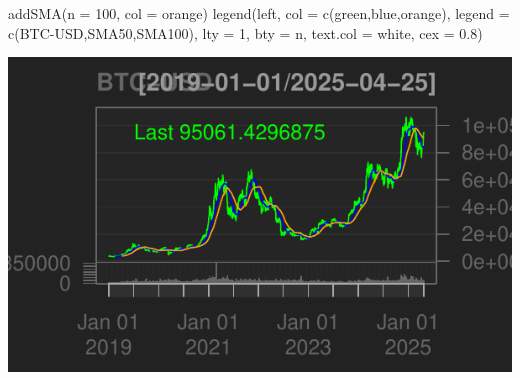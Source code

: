 \documentclass[]{tufte-handout}
\newenvironment{Shaded}{}{}
\newcommand{\AttributeTok}[1]{\textcolor[rgb]{0.49,0.56,0.16}{#1}}
\newcommand{\CommentTok}[1]{\textcolor[rgb]{0.38,0.63,0.69}{\textit{#1}}}
\newcommand{\DecValTok}[1]{\textcolor[rgb]{0.25,0.63,0.44}{#1}}
\newcommand{\FloatTok}[1]{\textcolor[rgb]{0.25,0.63,0.44}{#1}}
\newcommand{\FunctionTok}[1]{\textcolor[rgb]{0.02,0.16,0.49}{#1}}
\newcommand{\NormalTok}[1]{#1}
\newcommand{\OtherTok}[1]{\textcolor[rgb]{0.00,0.44,0.13}{#1}}
\newcommand{\SpecialCharTok}[1]{\textcolor[rgb]{0.25,0.44,0.63}{#1}}
\newcommand{\StringTok}[1]{\textcolor[rgb]{0.25,0.44,0.63}{#1}}
\begin{document}
\begin{Shaded}
\begin{Highlighting}[]
\FunctionTok{addSMA}\NormalTok{(}\AttributeTok{n =} \DecValTok{100}\NormalTok{, }\AttributeTok{col =} \StringTok{\textquotesingle{}orange\textquotesingle{}}\NormalTok{)}
\FunctionTok{legend}\NormalTok{(}\StringTok{\textquotesingle{}left\textquotesingle{}}\NormalTok{, }\AttributeTok{col =} \FunctionTok{c}\NormalTok{(}\StringTok{\textquotesingle{}green\textquotesingle{}}\NormalTok{,}\StringTok{\textquotesingle{}blue\textquotesingle{}}\NormalTok{,}\StringTok{\textquotesingle{}orange\textquotesingle{}}\NormalTok{),}
       \AttributeTok{legend =} \FunctionTok{c}\NormalTok{(}\StringTok{\textquotesingle{}BTC{-}USD\textquotesingle{}}\NormalTok{,}\StringTok{\textquotesingle{}SMA50\textquotesingle{}}\NormalTok{,}\StringTok{\textquotesingle{}SMA100\textquotesingle{}}\NormalTok{), }\AttributeTok{lty =} \DecValTok{1}\NormalTok{, }\AttributeTok{bty =} \StringTok{\textquotesingle{}n\textquotesingle{}}\NormalTok{,}
       \AttributeTok{text.col =} \StringTok{\textquotesingle{}white\textquotesingle{}}\NormalTok{, }\AttributeTok{cex =} \FloatTok{0.8}\NormalTok{)}
\end{Highlighting}
\end{Shaded}

\includegraphics{cripto_update_files/figure-latex/unnamed-chunk-5-3}

\begin{Shaded}
\end{Shaded}
\end{document}
